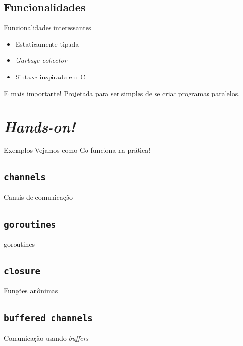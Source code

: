 \documentclass{beamer}
\begin{document}
\subsection{Funcionalidades}
\begin{frame}
    {Funcionalidades interessantes}
    \begin{itemize}
        \item Estaticamente tipada
        \item {\em Garbage collector}
        \item Sintaxe inspirada em C
    \end{itemize}
\end{frame}

\begin{frame}
    {E mais importante!}
    \pause
    Projetada para ser simples de se criar programas paralelos.
\end{frame}

\section{\em Hands-on!}
\begin{frame}
    {Exemplos}
    Vejamos como Go funciona na prática!
\end{frame}

\subsection{\tt channels}
\begin{frame}
    {Canais de comunicação}
\end{frame}

\subsection{\tt goroutines}
\begin{frame}
    {goroutines}
\end{frame}

\subsection{\tt closure}
\begin{frame}
    {Funções anônimas}
\end{frame}

\subsection{\tt buffered channels}
\begin{frame}
    {Comunicação usando {\em buffers}}
\end{frame}
\end{document}

